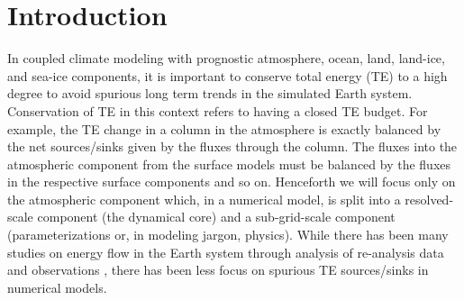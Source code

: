 \documentclass{agujournal}
\begin{document}
%
%

% 


%
% 
% 
% 


\section{Introduction}
In coupled climate modeling with prognostic atmosphere, ocean, land, land-ice, and sea-ice components, it is important to conserve total energy (TE) to a high degree to avoid spurious long term trends in the simulated Earth system. Conservation of TE in this context refers to having a closed TE budget. For example, the TE change in a column in the atmosphere is exactly balanced by the net sources/sinks given by the fluxes through the column. The fluxes into the atmospheric component from the surface models must be balanced by the fluxes in the respective surface components and so on. Henceforth we will focus only on the atmospheric component which, in a numerical model, is split into a resolved-scale component (the dynamical core) and a sub-grid-scale component (parameterizations or, in modeling jargon, physics). While there has been many studies on energy flow in the Earth system through analysis of re-analysis data and observations \citep[][and references herein]{TF2018JC}, there has been less focus on spurious TE sources/sinks in numerical models.
\end{document}
